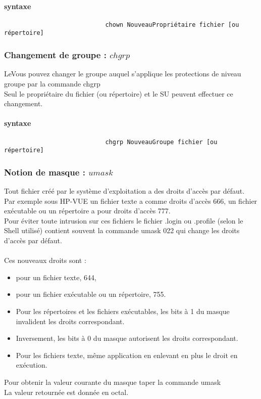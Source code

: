 					\paragraph{syntaxe}
						\begin{verbatim}
							chown NouveauPropriétaire fichier [ou répertoire]
						\end{verbatim}	

				\subsubsection{Changement de groupe : $chgrp$}					
					LeVous pouvez changer le groupe auquel s'applique les protections de niveau groupe par la commande chgrp \\
					Seul le propriétaire du fichier (ou répertoire) et le SU peuvent effectuer ce changement.
					\paragraph{syntaxe}
						\begin{verbatim}
							chgrp NouveauGroupe fichier [ou répertoire]
						\end{verbatim}	
						
				\subsubsection{Notion de masque : $umask$}					
					Tout fichier créé par le système d'exploitation a des droits d'accès par défaut.\\
					Par exemple sous HP-VUE un fichier texte a comme droits d'accès 666, un fichier exécutable ou un répertoire a pour droits d'accès 777.\\
					Pour éviter toute intrusion sur ces fichiers le fichier .login ou .profile (selon le Shell utilisé) contient souvent la commande umask 022 qui change les droits d'accès par défaut.\\ \\

					Ces nouveaux droits sont : \\
					\begin{itemize}
						\item pour un fichier texte, 644,
						\item pour un fichier exécutable ou un répertoire, 755.
						\item Pour les répertoires et les fichiers exécutables, les bits à 1 du masque invalident les droits correspondant.
						\item Inversement, les bits à 0 du masque autorisent les droits correspondant.
						\item Pour les fichiers texte, même application en enlevant en plus le droit en exécution.
					\end{itemize}
					Pour obtenir la valeur courante du masque taper la commande umask\\
					La valeur retournée est donnée en octal.\\ \\

